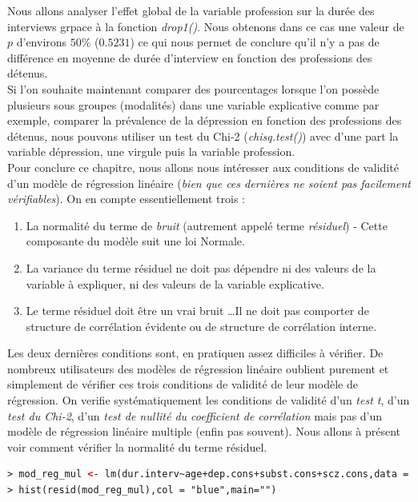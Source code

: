 Nous allons analyser l'effet global de la variable profession sur la durée des interviews grpace à la fonction \textit{drop1()}. Nous obtenons dans ce cas une valeur de $p$ d'environs $50\%$ ($0.5231$) ce qui nous permet de conclure qu'il n'y a pas de différence en moyenne de durée d'interview en fonction des professions des détenus.\newline
\\
Si l'on souhaite maintenant comparer des pourcentages lorsque l'on possède plusieurs sous groupes (modalités) dans une variable explicative comme par exemple, comparer la prévalence de la dépression en fonction des professions des détenus, nous pouvons utiliser un test du Chi-2 (\textit{chisq.test()}) avec d'une part la variable dépression, une virgule puis la variable profession.\newline
\\
Pour conclure ce chapitre, nous allons nous intéresser aux conditions de validité d'un modèle de régression linéaire (\textit{bien que ces dernières ne soient pas facilement vérifiables}).\newline
On en compte essentiellement trois : 
\begin{enumerate}
\item La normalité du terme de \textit{bruit} (autrement appelé terme \textit{résiduel}) - Cette composante du modèle suit une loi Normale.
\item La variance du terme résiduel ne doit pas dépendre ni des valeurs de la variable à expliquer, ni des valeurs de la variable explicative.
\item Le terme résiduel doit être un vrai bruit \dots Il ne doit pas comporter de structure de corrélation évidente ou de structure de corrélation interne.
\end{enumerate}
Les deux dernières conditions sont, en pratiquen assez difficiles à vérifier. De nombreux utilisateurs des modèles de régression linéaire oublient purement et simplement de vérifier ces trois conditions de validité de leur modèle de régression.\newline
On verifie systématiquement les conditions de validité d'un \textit{test t}, d'un \textit{test du Chi-2}, d'un \textit{test de nullité du coefficient de corrélation} mais pas d'un modèle de régression linéaire multiple (enfin pas souvent).\newline
Nous allons à présent voir comment vérifier la normalité du terme résiduel.

\begin{lstlisting}[language=html]
> mod_reg_mul <- lm(dur.interv~age+dep.cons+subst.cons+scz.cons,data = smp)
> hist(resid(mod_reg_mul),col = "blue",main="")
\end{lstlisting}

